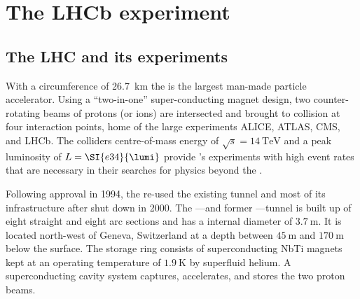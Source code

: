 
\chapter{The \acs*{LHCb} experiment}
\label{ch:lhcb_experiment}

\section{The \acs*{LHC} and its experiments}
\label{sec:lhcb_experiment:lhc}

With a circumference of \SI{26.7}{\kilo\metre} the \LHC is the largest man-made
particle accelerator. Using a \enquote{two-in-one} super-conducting magnet
design, two counter-rotating beams of protons (or ions) are intersected and
brought to collision at four interaction points, home of the large \LHC
experiments \acs*{ALICE}, \acs*{ATLAS}, \acs*{CMS}, and \acs*{LHCb}. The
colliders centre-of-mass energy of $\sqrt{s}=\SI{14}{\TeV}$ and a peak
luminosity of $L=\SI{e34}{\lumi}$ provide \LHC's experiments with high event
rates that are necessary in their searches for physics beyond the \SM.

Following approval in 1994, the \LHC re-used the existing \LEP tunnel and most
of its infrastructure after \LEP shut down in 2000. The \LHC---and former
\LEP---tunnel is built up of eight straight and eight arc sections and has a
internal diameter of $\SI{3.7}{\metre}$. It is located north-west of Geneva,
Switzerland at a depth between $\SI{45}{\metre}$ and $\SI{170}{\metre}$ below
the surface. The storage ring consists of superconducting NbTi magnets kept at
an operating temperature of $\SI{1.9}{\kelvin}$ by superfluid helium. A
superconducting \RF cavity system captures, accelerates, and stores the two
proton beams.

